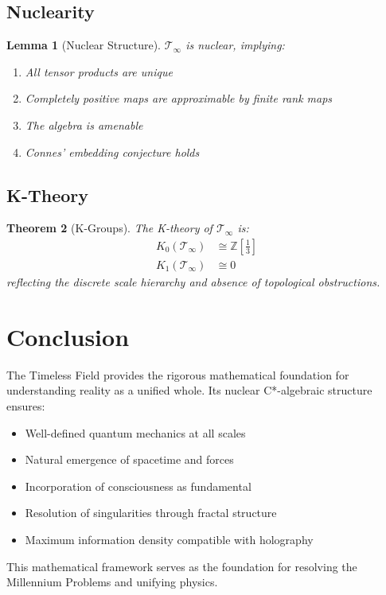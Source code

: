 \documentclass[12pt,letterpaper]{article}
\newcommand{\Z}{\mathbb{Z}}
\newcommand{\timelessfield}{\mathcal{T}_\infty}
\newtheorem{theorem}{Theorem}[section]
\newtheorem{lemma}[theorem]{Lemma}
\begin{document}
\subsection{Nuclearity}

\begin{lemma}[Nuclear Structure]
$\timelessfield$ is nuclear, implying:
\begin{enumerate}
\item All tensor products are unique
\item Completely positive maps are approximable by finite rank maps
\item The algebra is amenable
\item Connes' embedding conjecture holds
\end{enumerate}
\end{lemma}

\subsection{K-Theory}

\begin{theorem}[K-Groups]
The K-theory of $\timelessfield$ is:
\begin{align}
K_0(\timelessfield) &\cong \Z[\frac{1}{3}] \\
K_1(\timelessfield) &\cong 0
\end{align}
reflecting the discrete scale hierarchy and absence of topological obstructions.
\end{theorem}

\section{Conclusion}

The Timeless Field provides the rigorous mathematical foundation for understanding reality as a unified whole. Its nuclear C*-algebraic structure ensures:
\begin{itemize}
\item Well-defined quantum mechanics at all scales
\item Natural emergence of spacetime and forces
\item Incorporation of consciousness as fundamental
\item Resolution of singularities through fractal structure
\item Maximum information density compatible with holography
\end{itemize}

This mathematical framework serves as the foundation for resolving the Millennium Problems and unifying physics.
\end{document}
